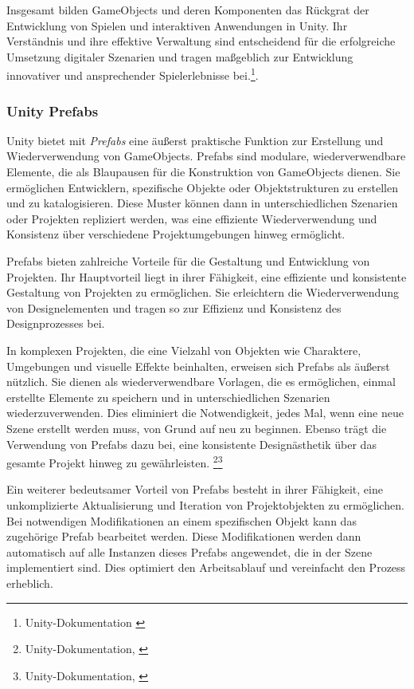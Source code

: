 Insgesamt bilden GameObjects und deren Komponenten das Rückgrat der Entwicklung von Spielen und interaktiven Anwendungen in
Unity. Ihr Verständnis und ihre effektive Verwaltung sind entscheidend für die erfolgreiche Umsetzung digitaler Szenarien
und tragen maßgeblich zur Entwicklung innovativer und ansprechender Spielerlebnisse bei.\footnote{Unity-Dokumentation \cite{GameObjects}}.

\subsubsection{\label{sec:prefabs}Unity Prefabs}

Unity bietet mit \textit{Prefabs} eine äußerst praktische Funktion zur Erstellung und Wiederverwendung von GameObjects. Prefabs sind modulare, wiederverwendbare Elemente, die als Blaupausen für die Konstruktion von GameObjects dienen. Sie ermöglichen Entwicklern, spezifische Objekte oder Objektstrukturen zu erstellen und zu katalogisieren. Diese Muster können dann in unterschiedlichen Szenarien oder Projekten repliziert werden, was eine effiziente Wiederverwendung und Konsistenz über verschiedene Projektumgebungen hinweg ermöglicht.

Prefabs bieten zahlreiche Vorteile für die Gestaltung und Entwicklung von Projekten. Ihr Hauptvorteil liegt in ihrer Fähigkeit, eine effiziente und konsistente Gestaltung von Projekten zu ermöglichen. Sie erleichtern die Wiederverwendung von Designelementen und tragen so zur Effizienz und Konsistenz des Designprozesses bei.

In komplexen Projekten, die eine Vielzahl von Objekten wie Charaktere, Umgebungen und visuelle Effekte beinhalten, erweisen sich Prefabs als äußerst nützlich. Sie dienen als wiederverwendbare Vorlagen, die es ermöglichen, einmal erstellte Elemente zu speichern und in unterschiedlichen Szenarien wiederzuverwenden. Dies eliminiert die Notwendigkeit, jedes Mal, wenn eine neue Szene erstellt werden muss, von Grund auf neu zu beginnen. Ebenso trägt die Verwendung
von Prefabs dazu bei, eine konsistente Designästhetik über das gesamte Projekt hinweg zu gewährleisten. \footnote{Unity-Dokumentation, \cite{Prefabs}}\footnote{Unity-Dokumentation, \cite{Prefabs-2}}


Ein weiterer bedeutsamer Vorteil von Prefabs besteht in ihrer Fähigkeit, eine unkomplizierte Aktualisierung und Iteration von Projektobjekten zu ermöglichen. Bei notwendigen Modifikationen an einem spezifischen Objekt kann das zugehörige Prefab bearbeitet werden. Diese Modifikationen werden dann automatisch auf alle Instanzen dieses Prefabs angewendet, die in der Szene implementiert sind. Dies optimiert den Arbeitsablauf und vereinfacht den Prozess erheblich.

